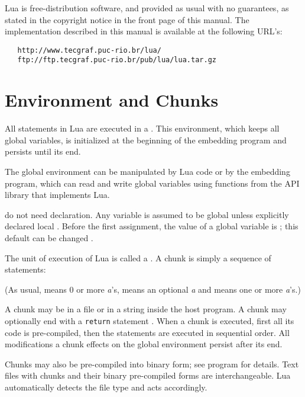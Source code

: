 Lua is free-distribution software,
and provided as usual with no guarantees,
as stated in the copyright notice in the front page of this manual.
The implementation described in this manual is available
at the following URL's:
\begin{verbatim}
   http://www.tecgraf.puc-rio.br/lua/
   ftp://ftp.tecgraf.puc-rio.br/pub/lua/lua.tar.gz
\end{verbatim}


\section{Environment and Chunks}

All statements in Lua are executed in a .
This environment, which keeps all global variables,
is initialized at the beginning of the embedding program and
persists until its end.

The global environment can be manipulated by Lua code or
by the embedding program,
which can read and write global variables
using functions from the API library that implements Lua.

 do not need declaration.
Any variable is assumed to be global unless explicitly declared local
.
Before the first assignment, the value of a global variable is \nil;
this default can be changed .

The unit of execution of Lua is called a .
A chunk is simply a sequence of statements:
\begin{Produc}
\end{Produc}%
(As usual,  means 0 or more \emph{a}'s,
 means an optional \emph{a} and  means
one or more \emph{a}'s.)

A chunk may be in a file or in a string inside the host program.
A chunk may optionally end with a \verb|return| statement .
When a chunk is executed, first all its code is pre-compiled,
then the statements are executed in sequential order.
All modifications a chunk effects on the global environment persist
after its end.

Chunks may also be pre-compiled into binary form;
see program  for details.
Text files with chunks and their binary pre-compiled forms
are interchangeable.
Lua automatically detects the file type and acts accordingly.

\section{} \label{TypesSec}

